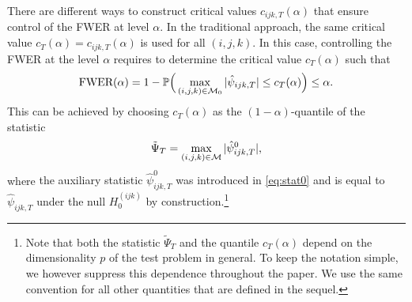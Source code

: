 \documentclass[a4paper,12pt]{article}
\numberwithin{equation}{section}
\begin{document}
There are different ways to construct critical values $c_{ijk,T}(\alpha)$ that ensure control of the FWER at level $\alpha$. In the traditional approach, the same critical value $c_T(\alpha) = c_{ijk,T}(\alpha)$ is used for all $(i,j,k)$. In this case, controlling the FWER at the level $\alpha$ requires to determine the critical value $c_T(\alpha)$ such that
\begin{equation}\label{eq:FWER-tilde}
\text{FWER}(\alpha) = 1 - \mathbb{P}\Big( \max_{(i,j,k) \in \mathcal{M}_0} |\hat{\psi}_{ijk,T}| \le c_T(\alpha) \Big) \le \alpha. 
\end{equation}
This can be achieved by choosing $c_T(\alpha)$ as the $(1-\alpha)$-quantile of the statistic 
\[ \tilde{\Psi}_T = \max_{(i,j,k) \in \mathcal{M}} |\hat{\psi}_{ijk,T}^0|, \]
where {\color{red} the auxiliary statistic $\hat{\psi}_{ijk,T}^0$ was introduced in \eqref{eq:stat0} and is equal to $\hat{\psi}_{ijk,T}$ under the null $H_0^{(ijk)}$ by construction.\footnote{{\color{red} Note that both the statistic $\tilde{\Psi}_T$ and the quantile $c_T(\alpha)$ depend on the dimensionality $p$ of the test problem in general. To keep the notation simple, we however suppress this dependence throughout the paper. We use the same convention for all other quantities that are defined in the sequel.}}} 
\end{document}
